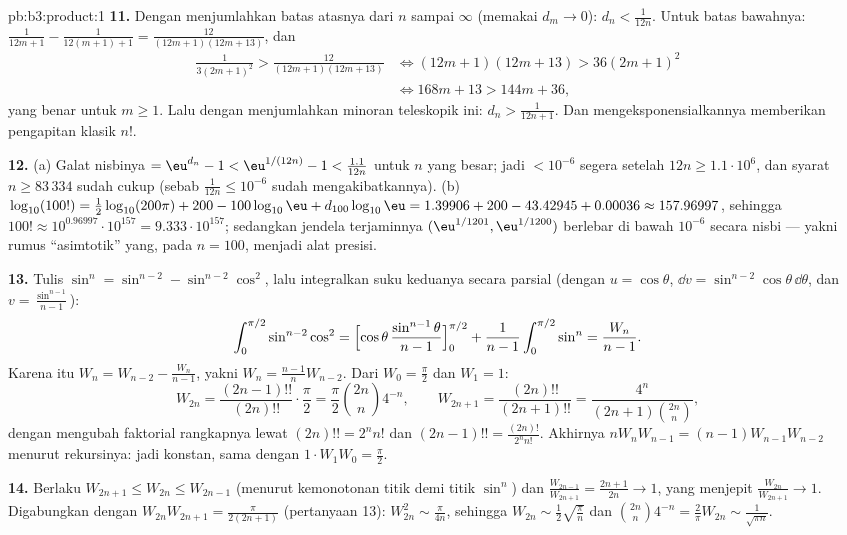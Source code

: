 \begin{solution}{pb:b3:product:1}
\textbf{11.} Dengan menjumlahkan batas atasnya dari $n$ sampai $\infty$
(memakai $d_m \to 0$): $d_n < \frac1{12n}$. Untuk batas bawahnya:
$\frac1{12m+1} - \frac1{12(m+1)+1} =
\frac{12}{(12m+1)(12m+13)}$, dan
\begin{align*}
\frac1{3(2m+1)^2} > \frac{12}{(12m+1)(12m+13)}
&\iff (12m+1)(12m+13) > 36(2m+1)^2 \\
&\iff 168m + 13 > 144m + 36,
\end{align*}
yang benar untuk $m \geq 1$. Lalu dengan menjumlahkan minoran teleskopik ini:
$d_n > \frac1{12n+1}$. Dan mengeksponensialkannya memberikan pengapitan
klasik $n!$.

\textbf{12.} (a) Galat nisbinya $= \eu^{d_n} - 1 <
\eu^{1/(12n)} - 1 < \frac{1.1}{12n}$ untuk $n$ yang besar; jadi $<
10^{-6}$ segera setelah $12n \geq 1.1\cdot10^6$, dan syarat
$n \geq 83\,334$ sudah cukup (sebab $\frac1{12n} \leq 10^{-6}$
sudah mengakibatkannya). (b) $\log_{10}(100!) =
\frac12\log_{10}(200\pi) + 200 - 100\log_{10}\eu +
d_{100}\log_{10}\eu = 1.39906 + 200 - 43.42945 + 0.00036
\approx 157.96997$, sehingga $100! \approx 10^{0.96997} \cdot
10^{157} = 9.333\cdot10^{157}$; sedangkan jendela terjaminnya
$(\eu^{1/1201}, \eu^{1/1200})$ berlebar di bawah $10^{-6}$ secara
nisbi --- yakni rumus ``asimtotik'' yang, pada $n =
100$, menjadi alat presisi.

\textbf{13.} Tulis $\sin^n = \sin^{n-2} - \sin^{n-2}\cos^2$,
lalu integralkan suku keduanya secara parsial (dengan $u = \cos\theta$,
$\dd v = \sin^{n-2}\cos\theta\,\dd\theta$, dan $v =
\frac{\sin^{n-1}}{n-1}$):
\[
\int_0^{\pi/2}\sin^{n-2}\cos^2 =
\Bigl[\cos\theta\,\frac{\sin^{n-1}\theta}{n-1}\Bigr]_0^{\pi/2}
+ \frac1{n-1}\int_0^{\pi/2}\sin^n = \frac{W_n}{n-1} .
\]
Karena itu $W_n = W_{n-2} - \frac{W_n}{n-1}$, yakni $W_n =
\frac{n-1}nW_{n-2}$. Dari $W_0 = \frac\pi2$ dan $W_1 = 1$:
\[
W_{2n} = \frac{(2n-1)!!}{(2n)!!}\cdot\frac\pi2
= \frac\pi2\binom{2n}n4^{-n},
\qquad
W_{2n+1} = \frac{(2n)!!}{(2n+1)!!}
= \frac{4^n}{(2n+1)\binom{2n}n},
\]
dengan mengubah faktorial rangkapnya lewat $(2n)!! = 2^nn!$ dan
$(2n-1)!! = \frac{(2n)!}{2^nn!}$. Akhirnya $nW_nW_{n-1} =
(n-1)W_{n-1}W_{n-2}$ menurut rekursinya: jadi konstan, sama dengan
$1\cdot W_1W_0 = \frac\pi2$.

\textbf{14.} Berlaku $W_{2n+1} \leq W_{2n} \leq W_{2n-1}$ (menurut kemonotonan
titik demi titik $\sin^n$) dan $\frac{W_{2n-1}}{W_{2n+1}} =
\frac{2n+1}{2n} \to 1$, yang menjepit $\frac{W_{2n}}{W_{2n+1}} \to
1$. Digabungkan dengan $W_{2n}W_{2n+1} = \frac{\pi}{2(2n+1)}$
(pertanyaan 13): $W_{2n}^2 \sim \frac\pi{4n}$, sehingga $W_{2n} \sim
\frac12\sqrt{\frac\pi n}$ dan $\binom{2n}n4^{-n} =
\frac2\pi W_{2n} \sim \frac1{\sqrt{\pi n}}$.


\end{solution}
